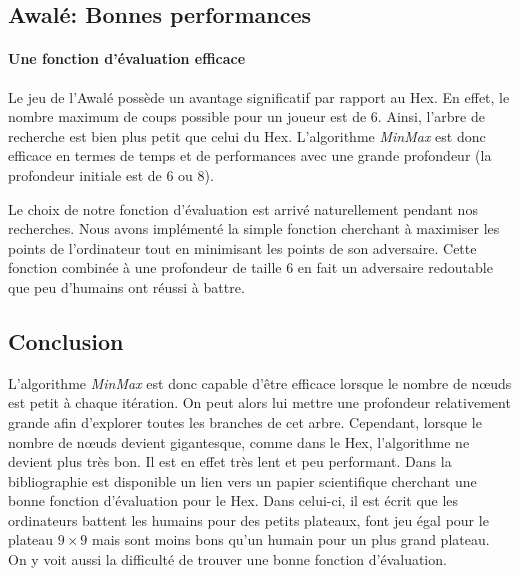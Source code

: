 


\subsection{Awalé: Bonnes performances}
\paragraph{Une fonction d'évaluation efficace} 
Le jeu de l'Awalé possède un avantage significatif par rapport au Hex. En effet, le nombre maximum de coups
possible pour un joueur est de 6. Ainsi, l'arbre de recherche est bien plus petit que celui du Hex. L'algorithme \emph{MinMax} est donc efficace en termes de
temps et de performances avec une grande profondeur (la profondeur initiale est de 6 ou 8).

Le choix de notre fonction d'évaluation est arrivé naturellement pendant nos recherches. Nous avons implémenté la simple fonction cherchant à
maximiser les points de l'ordinateur tout en minimisant les points de son adversaire. Cette fonction combinée à une profondeur de taille 6 en fait un
adversaire redoutable que peu d'humains ont réussi à battre.

\subsection{Conclusion}
L'algorithme \emph{MinMax} est donc capable d'être efficace lorsque le nombre de nœuds est petit à chaque itération. On peut alors
lui mettre une profondeur relativement grande afin d'explorer toutes les branches de cet arbre.
Cependant, lorsque le nombre de nœuds devient gigantesque, comme dans le Hex, l'algorithme ne devient plus très bon. Il est en effet très lent et peu performant.
Dans la bibliographie est disponible un lien vers un papier scientifique cherchant une bonne fonction d'évaluation pour le Hex.
Dans celui-ci, il est écrit que les ordinateurs battent les humains pour des petits plateaux, font jeu égal pour le plateau $9\times9$ mais
sont moins bons qu'un humain pour un plus grand plateau. On y voit aussi la difficulté de trouver une bonne fonction d'évaluation.
